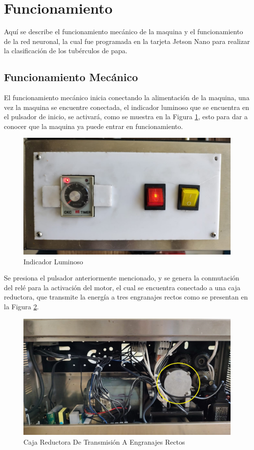 \section{Funcionamiento}
Aquí se describe el funcionamiento mecánico de la maquina y el funcionamiento de la red neuronal, la cual fue programada en la tarjeta Jetson Nano para realizar la clasificación de los tubérculos de papa.

\subsection{Funcionamiento Mecánico}
El funcionamiento mecánico inicia conectando la alimentación de la maquina, una vez la maquina se encuentre conectada, el indicador luminoso que se encuentra en el pulsador de inicio, se activará, como se muestra en la Figura \ref{fig:indicador}, esto para dar a conocer que la maquina ya puede entrar en funcionamiento.

\begin{figure}[ht]
	\centering
	\includegraphics[angle=270, scale=0.21]{Figs/200.jpg}
	\caption{Indicador Luminoso}
	\label{fig:indicador}
\end{figure}

Se presiona el pulsador anteriormente mencionado, y se genera la conmutación del relé para la activación del motor, el cual se encuentra conectado a una caja reductora, que transmite la energía a tres engranajes rectos como se presentan en la Figura \ref{fig:caja}.

\begin{figure}[ht]
	\centering
	\includegraphics[scale=0.13]{Figs/201.jpg}
	\caption{Caja Reductora De Transmisión A Engranajes Rectos}
	\label{fig:caja}
\end{figure}

